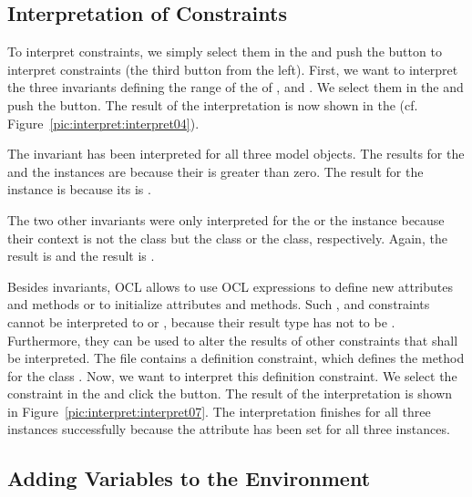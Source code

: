 \subsection{Interpretation of Constraints}

To interpret constraints, we simply select them in the  
and push the button to interpret constraints (the third button from the left). 
First, we want to interpret the three invariants defining the range of the 
 of ,  and . We 
select them in the  and push the 
button. The result of the interpretation is now shown in the  (cf. Figure~\ref{pic:interpret:interpret04}).

The invariant  has been interpreted for all three model
objects. The results for the  and the  instances
are  because their  is greater than zero. The result for
the  instance is  because its  is
.

The two other invariants were only interpreted for the  or the 
 instance because their context is not the class 
 but the  class or the  class, 
respectively. Again, the  result is  and the 
 result is .

Besides invariants, OCL allows to use OCL expressions to define new attributes
and methods or to initialize attributes and methods. Such ,
 and  constraints cannot be interpreted to 
or , because their result type has not to be .
Furthermore, they can be used to alter the results of other constraints that
shall be interpreted. The  file contains a definition
constraint, which defines the method  for the class
. Now, we want to interpret this definition constraint. We select
the constraint in the  and click the 
button. The result of the interpretation is shown in
Figure~\ref{pic:interpret:interpret07}. The interpretation finishes for all
three instances successfully because the attribute  has been set for
all three instances.


\subsection{Adding Variables to the Environment}

